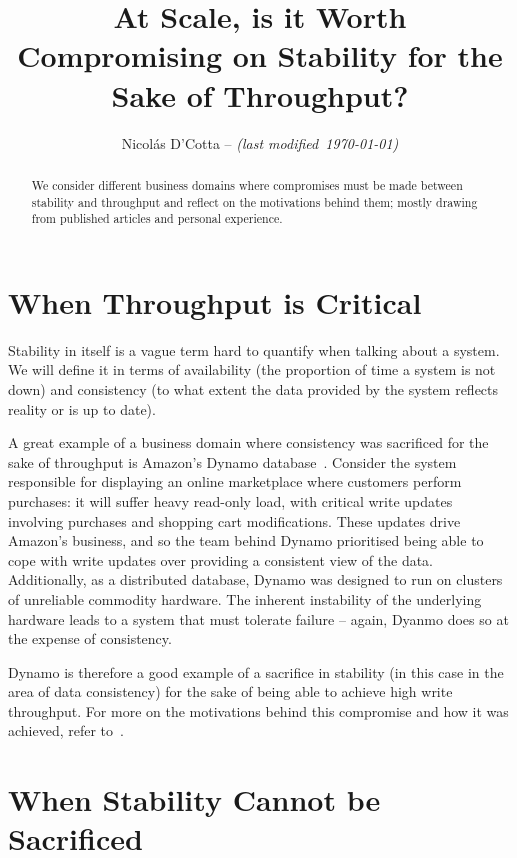 \documentclass[conference]{IEEEtran}
\title{At Scale, is it Worth Compromising on Stability for the Sake of Throughput?}
\begin{document}
    \author{Nicolás D'Cotta --
     \emph{(last modified~\today)}}

    \maketitle

    \begin{abstract}
        We consider different business domains where compromises must be made between stability and throughput and reflect on the motivations behind them;
        mostly drawing from published articles and personal experience.
    \end{abstract}


    \section{When Throughput is Critical}

    Stability in itself is a vague term hard to quantify when talking about a system.
    We will define it in terms of availability (the proportion of time a system is not down) and consistency (to what extent the data provided by the system reflects reality or is up to date).

    A great example of a business domain where consistency was sacrificed for the sake of throughput is Amazon's Dynamo database~\cite{amazonDynamoDb}.
    Consider the system responsible for displaying an online marketplace where customers perform purchases: it will suffer heavy read-only load, with critical write updates involving purchases and shopping cart modifications.
    These updates drive Amazon's business, and so the team behind Dynamo prioritised being able to cope with write updates over providing a consistent view of the data.
    Additionally, as a distributed database, Dynamo was designed to run on clusters of unreliable commodity hardware.
    The inherent instability of the underlying hardware leads to a system that must tolerate failure -- again, Dyanmo does so at the expense of consistency.

    Dynamo is therefore a good example of a sacrifice in stability (in this case in the area of data consistency) for the sake of being able to achieve high write throughput.
    For more on the motivations behind this compromise and how it was achieved, refer to~\cite{amazonDynamoDb}.


    \section{When Stability Cannot be Sacrificed}
\end{document}
